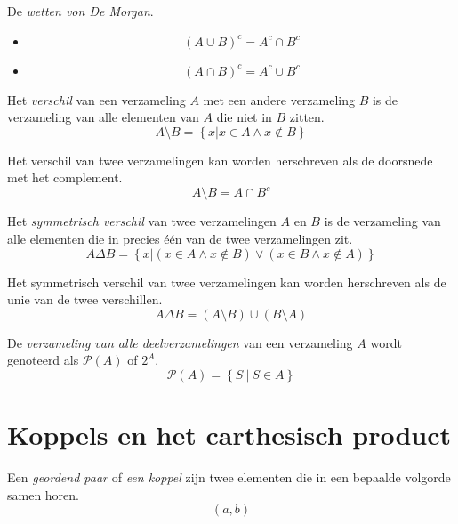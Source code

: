 \documentclass[main.tex]{subfiles}
\begin{document}
\begin{st}
  De \emph{wetten von De Morgan}.
  \begin{itemize}
  \item \[ (A \cup B)^{c} = A^{c} \cap B^{c} \]
  \item \[ (A \cap B)^{c} = A^{c} \cup B^{c} \]
  \end{itemize}
\end{st}

\begin{de}
  Het \emph{verschil} van een verzameling $A$ met een andere verzameling $B$ is de verzameling van alle elementen van $A$ die niet in $B$ zitten.
  \[ A \setminus B = \left\{ x | x \in A \wedge x \not\in B \right\} \]
\end{de}

\begin{st}
  Het verschil van twee verzamelingen kan worden herschreven als de doorsnede met het complement.
  \[ A \setminus B = A \cap B^{c} \]
\end{st}


\begin{de}
  Het \emph{symmetrisch verschil} van twee verzamelingen $A$ en $B$ is de verzameling van alle elementen die in precies \'e\'en van de twee verzamelingen zit.
  \[ A \Delta B = \left\{ x | (x \in A \wedge x \not\in B) \vee (x \in B \wedge x \not\in A) \right\} \]
\end{de}

\begin{st}
  Het symmetrisch verschil van twee verzamelingen kan worden herschreven als de unie van de twee verschillen.
  \[ A \Delta B = (A \setminus B) \cup (B \setminus A) \]
\end{st}

\begin{de}
  De \emph{verzameling van alle deelverzamelingen} van een verzameling $A$ wordt genoteerd als $\mathcal P(A)$ of $2^{A}$.
  \[ \mathcal P(A) = \left\{ S\ |\ S \in A \right\} \]
\end{de}

\section{Koppels en het carthesisch product}
\label{sec:koppels-en-het-carthesisch-product}

\begin{de}
  Een \emph{geordend paar} of \emph{een koppel} zijn twee elementen die in een bepaalde volgorde samen horen.
  \[ (a,b) \]
\end{de}
\end{document}

